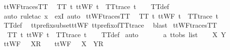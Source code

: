 \begin{isabellebody}
%
\isadelimdocument
%
\endisadelimdocument
{}\isamarkupfalse%
\ ttWF{\isacharunderscore}traces{\isacharunderscore}TT{}{\isacharcolon}\isanewline
\ \ {\isachardoublequoteopen}TT{}\ {\isacharbraceleft}t{\isachardot}\ ttWF\ t\ {\isasymand}\ TT{}{\isacharunderscore}trace\ t{\isacharbraceright}{\isachardoublequoteclose}\isanewline
%
\isadelimproof
\ \ %
\endisadelimproof
%
\isatagproof
{}\isamarkupfalse%
\ TT{}{\isacharunderscore}def\ \isamarkupfalse%
\ {\isacharparenleft}auto{\isacharcomma}\ rule{\isacharunderscore}tac\ x{\isacharequal}{\isachardoublequoteopen}{\isacharbrackleft}{\isacharbrackright}{\isachardoublequoteclose}\ \ exI{\isacharcomma}\ auto{\isacharparenright}%
\endisatagproof
{\isafoldproof}%
%
\isadelimproof
\isanewline
%
\endisadelimproof
\isanewline
{}\isamarkupfalse%
\ ttWF{\isacharunderscore}traces{\isacharunderscore}TT{}{\isacharcolon}\isanewline
\ \ {\isachardoublequoteopen}TT{}\ {\isacharbraceleft}t{\isachardot}\ ttWF\ t\ {\isasymand}\ TT{}{\isacharunderscore}trace\ t{\isacharbraceright}{\isachardoublequoteclose}\isanewline
%
\isadelimproof
\ \ %
\endisadelimproof
%
\isatagproof
{}\isamarkupfalse%
\ TT{}{\isacharunderscore}def\ \isamarkupfalse%
\ tt{\isacharunderscore}prefix{\isacharunderscore}subset{\isacharunderscore}ttWF\ tt{\isacharunderscore}prefix{\isacharunderscore}of{\isacharunderscore}TT{}{\isacharunderscore}trace\ \isamarkupfalse%
\ blast%
\endisatagproof
{\isafoldproof}%
%
\isadelimproof
\isanewline
%
\endisadelimproof
\isanewline
{}\isamarkupfalse%
\ ttWF{\isacharunderscore}traces{\isacharunderscore}TT{}{\isacharcolon}\isanewline
\ \ {\isachardoublequoteopen}TT{}\ {\isacharbraceleft}t{\isachardot}\ ttWF\ t\ {\isasymand}\ TT{}{\isacharunderscore}trace\ t{\isacharbraceright}{\isachardoublequoteclose}\isanewline
%
\isadelimproof
\ \ %
\endisadelimproof
%
\isatagproof
{}\isamarkupfalse%
\ TT{}{\isacharunderscore}def\isanewline
{}\isamarkupfalse%
\ auto\isanewline
\ \ \isamarkupfalse%
\ {\isasymrho}\ {\isasymsigma}\ {\isacharcolon}{\isacharcolon}\ {\isachardoublequoteopen}{\isacharprime}a\ ttobs\ list{\isachardoublequoteclose}\isanewline
\ \ \isamarkupfalse%
\ X\ Y\isanewline
\ \ \isamarkupfalse%
\ {\isachardoublequoteopen}ttWF\ {\isacharparenleft}{\isasymrho}\ {\isacharat}\ {\isacharbrackleft}X{\isacharbrackright}\isactrlsub R\ {\isacharhash}\ {\isasymsigma}{\isacharparenright}\ {\isasymLongrightarrow}\ ttWF\ {\isacharparenleft}{\isasymrho}\ {\isacharat}\ {\isacharbrackleft}X\ {\isasymunion}\ Y{\isacharbrackright}\isactrlsub R\ {\isacharhash}\ {\isasymsigma}{\isacharparenright}{\isachardoublequoteclose}\isanewline

\end{isabellebody}

